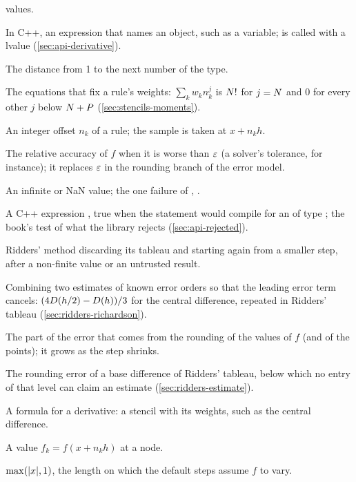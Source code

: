 \begin{description}
    values.
  \item[lvalue] In C++, an expression that names an object, such as a variable;  is called with a
     lvalue (\cref{sec:api-derivative}).
  \item[machine epsilon $\epsmach$] The distance from 1 to the next number of the type.
  \item[moment conditions] The equations that fix a rule's weights: $\sum_k w_k n_k^j$ is $N!$ for
    $j = N$ and 0 for every other $j$ below $N + P$ (\cref{sec:stencils-moments}).
  \item[node] An integer offset $n_k$ of a rule; the sample is taken at $x + n_k h$.
  \item[noise level $\noise$] The relative accuracy of $f$ when it is worse than $\epsmach$ (a solver's tolerance,
    for instance); it replaces $\epsmach$ in the rounding branch of the error model.
  \item[non-finite] An infinite or NaN value; the one failure of , .
  \item[requires-expression] A C++ expression , true when the statement
     would compile for an  of type ; the book's test of what the library rejects
    (\cref{sec:api-rejected}).
  \item[restart] Ridders' method discarding its tableau and starting again from a smaller step, after a non-finite
    value or an untrusted result.
  \item[Richardson extrapolation] Combining two estimates of known error orders so that the leading error term
    cancels: $(4 D(h/2) - D(h)) / 3$ for the central difference, repeated in Ridders' tableau
    (\cref{sec:ridders-richardson}).
  \item[rounding error] The part of the error that comes from the rounding of the values of $f$ (and of the points);
    it grows as the step shrinks.
  \item[rounding floor] The rounding error of a base difference of Ridders' tableau, below which no entry of that
    level can claim an estimate (\cref{sec:ridders-estimate}).
  \item[rule] A formula for a derivative: a stencil with its weights, such as the central difference.
  \item[sample] A value $f_k = f(x + n_k h)$ at a node.
  \item[scale $\scale$] $\max(\lvert x \rvert, 1)$, the length on which the default steps assume $f$ to vary.

\end{description}
